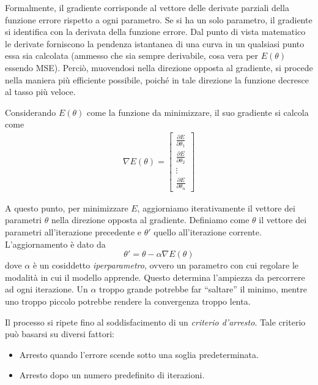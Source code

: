 \documentclass[12pt,a4paper,twoside,openright]{book}
\begin{document}
Formalmente, il gradiente corrisponde al vettore delle derivate parziali della funzione errore rispetto a ogni parametro. Se si ha un solo parametro, il gradiente si identifica con la derivata della funzione errore. Dal punto di vista matematico le derivate forniscono la pendenza istantanea di una curva in un qualsiasi punto essa sia calcolata (ammesso che sia sempre derivabile, cosa vera per $E(\theta)$ essendo MSE). Perciò, muovendosi nella direzione opposta al gradiente, si procede nella maniera più efficiente possibile, poiché in tale direzione la funzione decresce al tasso più veloce.

Considerando $E(\theta)$ come la funzione da minimizzare, il suo gradiente si calcola come
\begin{align*}
    \nabla E(\theta) = \begin{bmatrix}
        \frac{\partial E}{\partial \theta_1} \\
        \frac{\partial E}{\partial \theta_2} \\
        \vdots \\
        \frac{\partial E}{\partial \theta_n}
    \end{bmatrix}
\end{align*}

A questo punto, per minimizzare $E$, aggiorniamo iterativamente il vettore dei parametri $\theta$ nella direzione opposta al gradiente. Definiamo come $\theta$ il vettore dei parametri all'iterazione precedente e $\theta'$ quello all'iterazione corrente. L'aggiornamento è dato da 
\begin{equation}\label{eq:discesa_gradiente}
    \theta' = \theta - \alpha \nabla E(\theta)
\end{equation}
dove $\alpha$ è un cosiddetto \emph{iperparametro}, ovvero un parametro con cui regolare le modalità in cui il modello apprende. Questo determina l'ampiezza da percorrere ad ogni iterazione. Un $\alpha$ troppo grande potrebbe far ``saltare'' il minimo, mentre uno troppo piccolo potrebbe rendere la convergenza troppo lenta.

Il processo si ripete fino al soddisfacimento di un \emph{criterio d'arresto}. Tale criterio può basarsi su diversi fattori:

\begin{itemize}
\item Arresto quando l'errore scende sotto una soglia predeterminata.
\item Arresto dopo un numero predefinito di iterazioni.
\end{itemize}
\end{document}
